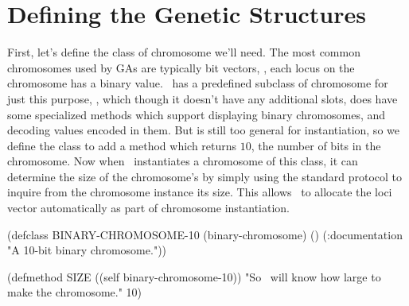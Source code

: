 {\samepage
\section{Defining the Genetic Structures}

First, let's define the class of chromosome we'll need. The most common chromosomes
used by GAs are typically bit vectors, \ie, each locus on the chromosome has a binary
value. \Geco\ has a predefined subclass of chromosome for just this purpose,
, which though it doesn't have any additional slots, does
have some specialized methods which support displaying binary chromosomes, and
decoding values encoded in them. But  is still too general
for instantiation, so we define the class  to add a
method  which returns $10$, the number of bits in the chromosome. Now
when \geco\ instantiates a chromosome of this class, it can determine the size of the
chromosome's  by simply using the standard protocol to inquire from
the chromosome instance its size. This allows \geco\ to allocate the loci vector
automatically as part of chromosome instantiation.
\begin{clcode}(defclass BINARY-CHROMOSOME-10 (binary-chromosome)
  ()
  (:documentation
   {\sf "A 10-bit binary chromosome."}))

(defmethod SIZE ((self binary-chromosome-10))
  {\sf "So \geco\ will know how large to make the chromosome."}
  10)\end{clcode}
}%

\filbreak

